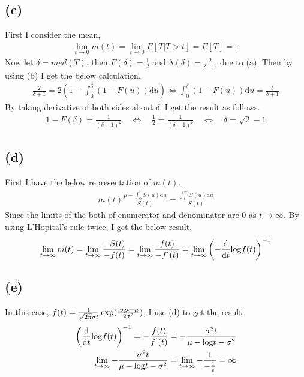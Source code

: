 \documentclass{article}
\begin{document}
\subsection{(c)}
First I consider the mean,
\begin{align*}
	\lim_{t \to 0} m(t) = \lim_{t \to 0} E[T | T > t] = E[T] = 1
\end{align*}
Now let $\delta = med(T)$, then $F(\delta) = \frac{1}{2}$ and $\lambda(\delta) = \frac{2}{\delta + 1}$ due to (a). Then by using (b) I get the below calculation.
\begin{align*}
	\frac{2}{\delta + 1} = 2 \left( 1 - \int_0^{\delta} (1 - F(u))\mathrm{d}u \right)
	\Leftrightarrow \int_0^{\delta} (1 - F(u)) \mathrm{d}u = \frac{\delta}{\delta + 1}
\end{align*}
By taking derivative of both sides about $\delta$, I get the result as follows.
\begin{align*}
	1 - F(\delta) = \frac{1}{(\delta+1)^2} \quad \Leftrightarrow \quad \frac{1}{2} = \frac{1}{(\delta+1)^2} \quad \Leftrightarrow \quad \delta = \sqrt{2} -1
\end{align*}

\subsection{(d)}
First I have the below representation of $m(t)$.
\begin{align*}
	m(t) \frac{\mu - \int_0^t S(u) \mathrm{d}u}{S(t)} = \frac{\int_t^{\infty} S(u) \mathrm{d}u}{S(t)}
\end{align*}
Since the limits of the both of enumerator and denominator are 0 as $t \to \infty$. By using L'Hopital's rule twice, I get the below result,
\begin{align*}
	\lim_{t \to \infty} m(t) = \lim_{t \to \infty} \frac{-S(t)}{-f(t)} = \lim_{t \to \infty} \frac{f(t)}{-f^{'}(t)} = \lim_{t \to \infty} \left( -\frac{\mathrm{d}}{\mathrm{d}t} {\rm log} f(t) \right)^{-1}
\end{align*}

\subsection{(e)}
In this case, $f(t) = \frac{1}{\sqrt{2\pi} \sigma t} \exp(\frac{{\rm log} t - \mu}{2\sigma^2})$, I use (d) to get the result.
\begin{align*}
	\left( \frac{\mathrm{d}}{\mathrm{d}t} {\rm log} f(t) \right)^{-1} = -\frac{f(t)}{f^{'}(t)} = - \frac{\sigma^2 t}{\mu - {\rm log}t - \sigma^2}\\
	\lim_{t \to \infty} -\frac{\sigma^2 t}{\mu - {\rm log}t - \sigma^2} = \lim_{t \to \infty} -\frac{1}{-\frac{1}{t}} = \infty
\end{align*}
\end{document}
